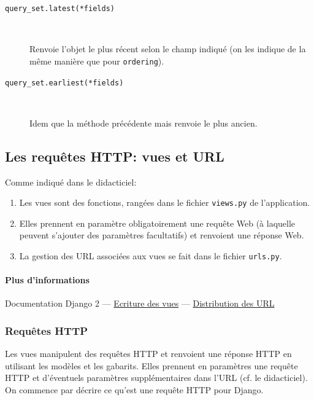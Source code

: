 \documentclass[a4paper, 10pt]{article}
\begin{document}
{\begin{itemize}
\begin{description}
		      \item[\texttt{query_set.latest(*fields)}]~

		            Renvoie l'objet le plus récent selon le champ indiqué (on les indique de la même manière que pour \texttt{ordering}).

		      \item[\texttt{query_set.earliest(*fields)}]~

		            Idem que la méthode précédente mais renvoie le plus ancien.

	      \end{description}
\end{itemize}

\subsection{Les requêtes HTTP: vues et URL}
Comme indiqué dans le didacticiel:
\begin{enumerate}
	\item Les vues sont des fonctions, rangées dans le fichier \texttt{views.py} de l'application.
	\item Elles prennent en paramètre obligatoirement une requête Web (à laquelle peuvent s'ajouter des paramètres facultatifs) et renvoient une réponse Web.
	\item La gestion des URL associées aux vues se fait dans le fichier \texttt{urls.py}.
\end{enumerate}

\paragraph{Plus d'informations} Documentation Django 2 --- \href{https://docs.djangoproject.com/fr/2.0/topics/http/views/}{Ecriture des vues} ---  \href{https://docs.djangoproject.com/fr/2.0/topics/http/urls/}{Distribution des URL}

\subsubsection{Requêtes HTTP}
Les  vues manipulent des requêtes HTTP et renvoient une réponse HTTP en utilisant les modèles et les gabarits. Elles prennent en paramètres une requête HTTP et d'éventuels paramètres supplémentaires dans l'URL (cf. le didacticiel). On commence par décrire ce qu'est une requête HTTP pour Django.

}
\end{document}
